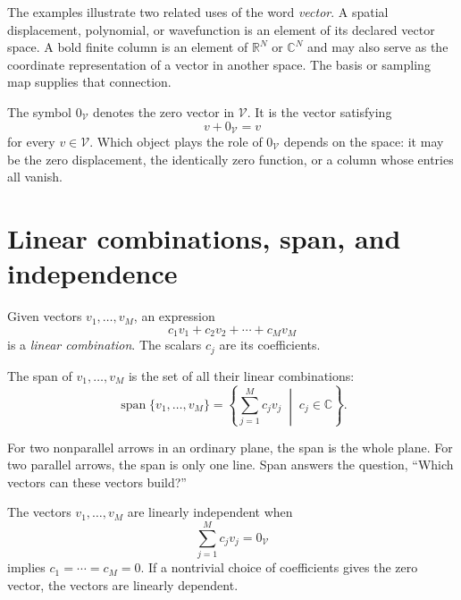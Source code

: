 The examples illustrate two related uses of the word \emph{vector}. A spatial
displacement, polynomial, or wavefunction is an element of its declared vector
space. A bold finite column is an element of \(\mathbb R^N\) or
\(\mathbb C^N\) and may also serve as the coordinate representation of a
vector in another space. The basis or sampling map supplies that connection.

The symbol \(0_{\mathcal V}\) denotes the zero vector in \(\mathcal V\). It
is the vector satisfying
\begin{equation}
  v+0_{\mathcal V}=v
\end{equation}
for every \(v\in\mathcal V\). Which object plays the role of \(0_{\mathcal V}\)
depends on the space: it may be the zero displacement, the identically zero
function, or a column whose entries all vanish.

\section{Linear combinations, span, and independence}

Given vectors \(v_1,\ldots,v_M\), an expression
\begin{equation}
  c_1v_1+c_2v_2+\cdots+c_Mv_M
\end{equation}
is a \emph{linear combination}. The scalars \(c_j\) are its coefficients.

\begin{definition}[Span]
The span of \(v_1,\ldots,v_M\) is the set of all their linear combinations:
\begin{equation}
  \operatorname{span}\{v_1,\ldots,v_M\}
  =\left\{\sum_{j=1}^{M}c_jv_j\;\middle|\;c_j\in\mathbb C\right\}.
\end{equation}
\end{definition}

For two nonparallel arrows in an ordinary plane, the span is the whole plane.
For two parallel arrows, the span is only one line. Span answers the question,
``Which vectors can these vectors build?''

\begin{definition}
The vectors \(v_1,\ldots,v_M\) are linearly independent when
\begin{equation}
  \sum_{j=1}^{M}c_jv_j=0_{\mathcal V}
\end{equation}
implies \(c_1=\cdots=c_M=0\). If a nontrivial choice of coefficients gives the
zero vector, the vectors are linearly dependent.
\end{definition}


